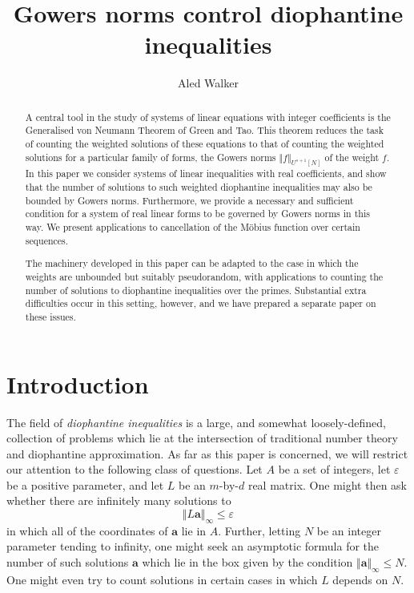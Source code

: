 \documentclass[12pt,a4paper,twoside,reqno]{amsart}
\title{Gowers norms control diophantine inequalities}
\author{Aled Walker}
\numberwithin{equation}{section}
\begin{document}
\begin{abstract}
A central tool in the study of systems of linear equations with integer coefficients is the Generalised von Neumann Theorem of Green and Tao. This theorem reduces the task of counting the weighted solutions of these equations to that of counting the weighted solutions for a particular family of forms, the Gowers norms $\Vert f \Vert_{U^{s+1}[N]}$ of the weight $f$. In this paper we consider systems of linear inequalities with real coefficients, and show that the number of solutions to such weighted diophantine inequalities may also be bounded by Gowers norms. Furthermore, we provide a necessary and sufficient condition for a system of real linear forms to be governed by Gowers norms in this way. We present applications to cancellation of the M\"{o}bius function over certain sequences. 

The machinery developed in this paper can be adapted to the case in which the weights are unbounded but suitably pseudorandom, with applications to counting the number of solutions to diophantine inequalities over the primes. Substantial extra difficulties occur in this setting, however, and we have prepared a separate paper on these issues. 
\end{abstract}
\maketitle
\tableofcontents
\section{Introduction}
\label{Sec introduction}

The field of \emph{diophantine inequalities} is a large, and somewhat loosely-defined, collection of problems which lie at the intersection of traditional number theory and diophantine approximation. As far as this paper is concerned, we will restrict our attention to the following class of questions. Let $A$ be a set of integers, let $\varepsilon$ be a positive parameter, and let $L$ be an $m$-by-$d$ real matrix. One might then ask whether there are infinitely many solutions to 
\begin{equation}
\label{the general inequality}
\Vert L\mathbf{a}\Vert_{\infty}\leqslant \varepsilon
\end{equation}
\noindent in which all of the coordinates of $\mathbf{a}$ lie in $A$. Further, letting $N$ be an integer parameter tending to infinity, one might seek an asymptotic formula for the number of such solutions $\mathbf{a}$ which lie in the box given by the condition $\Vert \mathbf{a} \Vert_\infty \leqslant N$. One might even try to count solutions in certain cases in which $L$ depends on $N$.  
\end{document}
